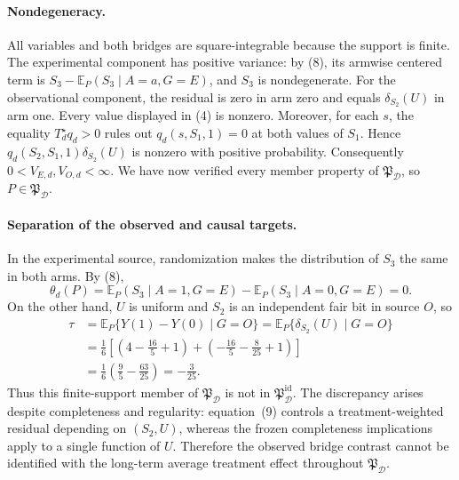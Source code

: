 \paragraph{Nondegeneracy.}
All variables and both bridges are square-integrable because the support is finite.  The experimental component has positive variance: by (8), its armwise centered term is \(S_3-\mathbb E_P(S_3\mid A=a,G=E)\), and \(S_3\) is nondegenerate.  For the observational component, the residual is zero in arm zero and equals \(\delta_{S_2}(U)\) in arm one.  Every value displayed in (4) is nonzero.  Moreover, for each \(s\), the equality \(T_d^\star q_d>0\) rules out \(q_d(s,S_1,1)=0\) at both values of \(S_1\).  Hence \(q_d(S_2,S_1,1)\delta_{S_2}(U)\) is nonzero with positive probability.  Consequently \(0<V_{E,d},V_{O,d}<\infty\).  We have now verified every member property of \(\mathfrak P_{\mathcal D}\), so \(P\in\mathfrak P_{\mathcal D}\).

\paragraph{Separation of the observed and causal targets.}
In the experimental source, randomization makes the distribution of \(S_3\) the same in both arms.  By (8),
\[
 \theta_d(P)
 =\mathbb E_P(S_3\mid A=1,G=E)
  -\mathbb E_P(S_3\mid A=0,G=E)
 =0.
 \tag{11}
\]
On the other hand, \(U\) is uniform and \(S_2\) is an independent fair bit in source \(O\), so
\[
 \begin{aligned}
 \tau
 &=\mathbb E_P\{Y(1)-Y(0)\mid G=O\}
 =\mathbb E_P\{\delta_{S_2}(U)\mid G=O\}\\
 &=\frac16\left[
 \left(4-\frac{16}{5}+1\right)
 +\left(-\frac{16}{5}-\frac8{25}+1\right)
 \right]\\
 &=\frac16\left(\frac95-\frac{63}{25}\right)
 =-\frac3{25}.
 \end{aligned}
 \tag{12}
\]
Thus this finite-support member of \(\mathfrak P_{\mathcal D}\) is not in \(\mathfrak P_{\mathcal D}^{\mathrm{id}}\).  The discrepancy arises despite completeness and regularity: equation~(9) controls a treatment-weighted residual depending on \((S_2,U)\), whereas the frozen completeness implications apply to a single function of \(U\).  Therefore the observed bridge contrast cannot be identified with the long-term average treatment effect throughout \(\mathfrak P_{\mathcal D}\).